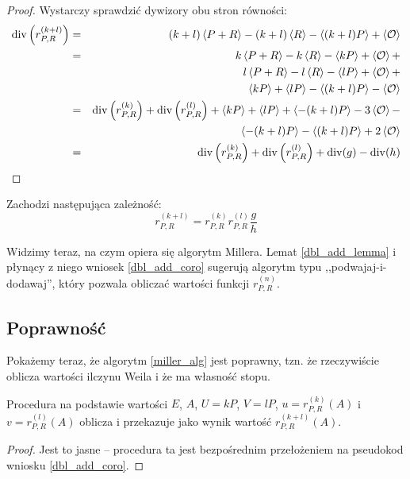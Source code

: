 \begin{proof}
Wystarczy sprawdzić dywizory obu stron równości:
\begin{eqnarray*}
\operatorname{div}\left(r_{P,R}^{(k+l)}\right)
& = & (k+l)\left\langle P+R\right\rangle - (k+l)\left\langle R\right\rangle - \left\langle(k+l)P\right\rangle + \left\langle\mathcal{O}\right\rangle \\
& = & k\left\langle P+R\right\rangle - k\left\langle R\right\rangle - \left\langle kP\right\rangle + \left\langle\mathcal{O}\right\rangle + \\
&   & l\left\langle P+R\right\rangle - l\left\langle R\right\rangle - \left\langle lP\right\rangle + \left\langle\mathcal{O}\right\rangle + \\
&   & \left\langle kP\right\rangle + \left\langle lP\right\rangle - \left\langle(k+l)P\right\rangle - \left\langle\mathcal{O}\right\rangle \\
& = & \operatorname{div}\left(r_{P,R}^{(k)}\right) + \operatorname{div}\left(r_{P,R}^{(l)}\right) +
      \left\langle kP\right\rangle + \left\langle lP\right\rangle + \left\langle-(k+l)P\right\rangle - 3\left\langle\mathcal{O}\right\rangle - \\
&   & \left\langle-(k+l)P\right\rangle - \left\langle(k+l)P\right\rangle + 2\left\langle\mathcal{O}\right\rangle \\
& = & \operatorname{div}\left(r_{P,R}^{(k)}\right) + \operatorname{div}\left(r_{P,R}^{(l)}\right) +
      \operatorname{div}(g) - \operatorname{div}(h)
\end{eqnarray*}
\end{proof}

\begin{corollary}\label{dbl_add_coro}
Zachodzi następująca zależność:
\begin{equation}
r_{P,R}^{(k+l)} = r_{P,R}^{(k)} r_{P,R}^{(l)} \frac{g}{h}
\end{equation}
\end{corollary}

\noindent
Widzimy teraz, na czym opiera się algorytm Millera.
Lemat \ref{dbl_add_lemma} i płynący z niego wniosek \ref{dbl_add_coro}
sugerują algorytm typu ,,podwajaj-i-dodawaj'',
który pozwala obliczać wartości funkcji $r_{P,R}^{(n)}$.

\subsection*{Poprawność}

\noindent
Pokażemy teraz, że algorytm \ref{miller_alg} jest poprawny,
tzn. że rzeczywiście oblicza wartości ilczynu Weila
i że ma własność stopu.

\begin{lemma}
Procedura 
na podstawie wartości
$E$, $A$, $U = kP$, $V = lP$, $u = r_{P,R}^{(k)}(A)$ i $v = r_{P,R}^{(l)}(A)$
oblicza i przekazuje jako wynik
wartość $r_{P,R}^{(k+l)}(A)$.
\end{lemma}

\begin{proof}
Jest to jasne -- procedura ta jest bezpośrednim przełożeniem na pseudokod
wniosku \ref{dbl_add_coro}.
\end{proof}

